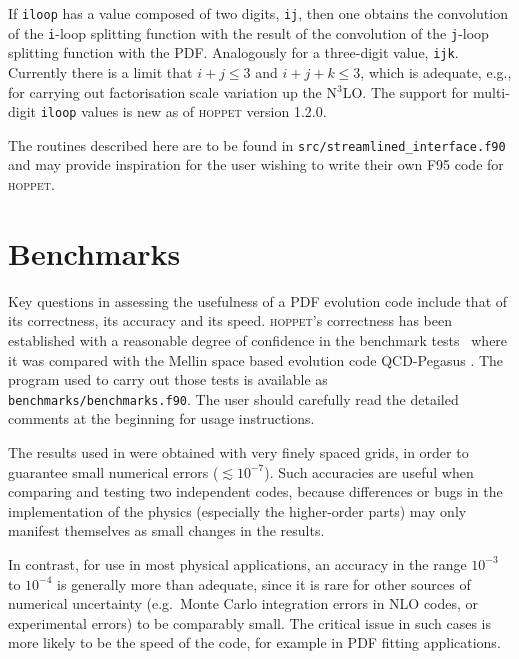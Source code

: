 \documentclass[12pt]{article}
\newcommand{\eg}{e.g.\ }
\newcommand{\hoppet}{\textsc{hoppet}\xspace}
\newcommand{\ttt}[1]{\texttt{#1}}
\begin{document}
If \ttt{iloop} has a value composed of two digits, \ttt{ij},
then one obtains the convolution of the \ttt{i}-loop splitting function
with the result of the convolution of the \ttt{j}-loop splitting
function with the PDF. 
%
Analogously for a three-digit value, \ttt{ijk}.
%
Currently there is a limit that $i+j \le 3$ and $i+j+k \le 3$, which
is adequate, e.g., for carrying out factorisation scale variation up
the N$^3$LO.
%
The support for multi-digit \ttt{iloop} values is new as of \hoppet
version 1.2.0.

The routines described here 
are to be 
found in \ttt{src/streamlined\_interface.f90} and may provide inspiration
for the user wishing to write their own F95 code for \hoppet.



\section{Benchmarks}
\label{sec:benchmarks}

Key questions in assessing the usefulness of a PDF evolution code include
that of its correctness, its accuracy and its speed. \hoppet's
correctness has been established with a reasonable degree of
confidence in the benchmark tests~\cite{Giele:2002hx,Dittmar:2005ed} where it was
compared with the Mellin space based
evolution code QCD-Pegasus \cite{Pegasus}. 
The program used to carry out those tests
is available as \ttt{benchmarks/benchmarks.f90}. The user should
carefully read the detailed
comments at the beginning for usage instructions.

The results used in \cite{Giele:2002hx,Dittmar:2005ed} were obtained with very finely
spaced grids, in order to guarantee small numerical errors ($\lesssim
10^{-7}$).  Such accuracies are useful when comparing and testing two
independent codes, because differences or bugs in the
implementation of the physics (especially the higher-order parts) may
only manifest themselves as small changes in the results.

In contrast, for use in most physical applications, an accuracy in the
range $10^{-3}$ to $10^{-4}$ is generally more than adequate, since it
is rare for other sources of numerical uncertainty (\eg Monte Carlo
integration errors in NLO codes, or experimental errors) to be
comparably small. The critical issue in such cases is more likely to
be the speed of the code, for example in PDF fitting
applications.
\end{document}
